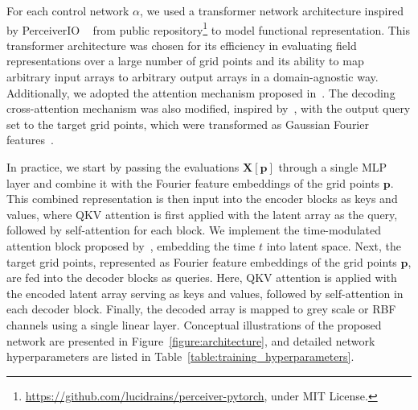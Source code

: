 \documentclass[nohyperref]{article}
\theoremstyle{plain}
\theoremstyle{remark}
\begin{document}
For each control network $\alpha$, we used a transformer network architecture inspired by PerceiverIO ~\citep{jaegle2022perceiver} from public repository\footnote{\url{https://github.com/lucidrains/perceiver-pytorch}, under MIT License.} to model functional representation. This transformer architecture was chosen for its efficiency in evaluating field representations over a large number of grid points and its ability to map arbitrary input arrays to arbitrary output arrays in a domain-agnostic way. Additionally, we adopted the attention mechanism proposed in~\citep{peebles2023scalable}. The decoding cross-attention mechanism was also modified, inspired by~\citep{li2022transformer}, with the output query set to the target grid points, which were transformed as Gaussian Fourier features~\citep{NEURIPS2020_55053683}.

In practice, we start by passing the evaluations \(\mathbf{X}[\mathbf{p}]\) through a single MLP layer and combine it with the Fourier feature embeddings of the grid points \(\mathbf{p}\). This combined representation is then input into the encoder blocks as keys and values, where QKV attention is first applied with the latent array as the query, followed by self-attention for each block. We implement the time-modulated attention block proposed by~\citep{peebles2023scalable}, embedding the time \(t\) into latent space. Next, the target grid points, represented as Fourier feature embeddings of the grid points \(\mathbf{p}\), are fed into the decoder blocks as queries. Here, QKV attention is applied with the encoded latent array serving as keys and values, followed by self-attention in each decoder block. Finally, the decoded array is mapped to grey scale or RBF channels using a single linear layer. Conceptual illustrations of the proposed network are presented in Figure~\ref{figure:architecture}, and detailed network hyperparameters are listed in Table~\ref{table:training_hyperparameters}.
\end{document}
